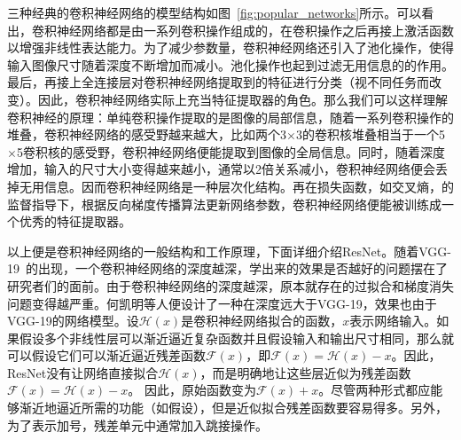 三种经典的卷积神经网络的模型结构如图~\ref{fig:popular_networks}所示。可以看出，卷积神经网络都是由一系列卷积操作组成的，在卷积操作之后再接上激活函数以增强非线性表达能力。为了减少参数量，卷积神经网络还引入了池化操作，使得输入图像尺寸随着深度不断增加而减小。池化操作也起到过滤无用信息的的作用。最后，再接上全连接层对卷积神经网络提取到的特征进行分类（视不同任务而改变）。因此，卷积神经网络实际上充当特征提取器的角色。那么我们可以这样理解卷积神经的原理：单纯卷积操作提取的是图像的局部信息，随着一系列卷积操作的堆叠，卷积神经网络的感受野越来越大，比如两个3$\times$3的卷积核堆叠相当于一个5$\times$5卷积核的感受野，卷积神经网络便能提取到图像的全局信息。同时，随着深度增加，输入的尺寸大小变得越来越小，通常以2倍关系减小，卷积神经网络便会丢掉无用信息。因而卷积神经网络是一种层次化结构。再在损失函数，如交叉熵，的监督指导下，根据反向梯度传播算法更新网络参数，卷积神经网络便能被训练成一个优秀的特征提取器。

以上便是卷积神经网络的一般结构和工作原理，下面详细介绍ResNet。随着VGG-19~\cite{simonyan2014very}的出现，一个卷积神经网络的深度越深，学出来的效果是否越好的问题摆在了研究者们的面前。由于卷积神经网络的深度越深，原本就存在的过拟合和梯度消失问题变得越严重。何凯明等人便设计了一种在深度远大于VGG-19，效果也由于VGG-19的网络模型。设$\mathcal{H}(x)$是卷积神经网络拟合的函数，$x$表示网络输入。如果假设多个非线性层可以渐近逼近复杂函数并且假设输入和输出尺寸相同，那么就可以假设它们可以渐近逼近残差函数$\mathcal{F}(x)$，即$\mathcal{F}(x)=\mathcal{H}(x)− x$。因此，ResNet没有让网络直接拟合$\mathcal{H}(x)$，而是明确地让这些层近似为残差函数$\mathcal{F}(x)=\mathcal{H}(x)-x$。 因此，原始函数变为$\mathcal{F}(x)+x$。尽管两种形式都应能够渐近地逼近所需的功能（如假设），但是近似拟合残差函数要容易得多。另外，为了表示加号，残差单元中通常加入跳接操作。

